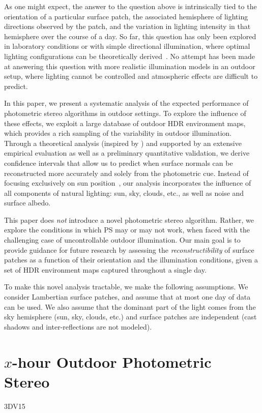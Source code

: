 \documentclass{report}
\begin{document}
As one might expect, the answer to the question above is intrinsically tied to the orientation of a particular surface patch, the associated hemisphere of lighting directions observed by the patch, and the variation in lighting intensity in that hemisphere over the course of a day. So far, this question has only been explored in laboratory conditions or with simple directional illumination, where optimal lighting configurations can be theoretically derived~\cite{drbohlav-iccv-05,klaudiny-prl-14,shen-pg-14}. No attempt has been made at answering this question with more realistic illumination models in an outdoor setup, where lighting cannot be controlled and atmospheric effects are difficult to predict.

In this paper, we present a systematic analysis of the expected performance of photometric stereo algorithms in outdoor settings. To explore the influence of these effects, we exploit a large database of outdoor HDR environment maps, which provides a rich sampling of the variability in outdoor illumination. Through a theoretical analysis (inspired by \cite{sun-ivc-07}) and supported by an extensive empirical evaluation as well as a preliminary quantitative validation, we derive confidence intervals that allow us to predict when surface normals can be reconstructed more accurately and solely from the photometric cue. Instead of focusing exclusively on sun position~\cite{shen-pg-14}, our analysis incorporates the influence of all components of natural lighting: sun, sky, clouds, etc., as well as noise and surface albedo. 

This paper does \emph{not} introduce a novel photometric stereo algorithm. Rather, we explore the conditions in which PS may or may not work, when faced with the challenging case of uncontrollable outdoor illumination. Our main goal is to provide guidance for future research by assessing the \emph{reconstructibility} of surface patches as a function of their orientation and the illumination conditions, given a set of HDR environment maps captured throughout a single day.

To make this novel analysis tractable, we make the following assumptions. We consider Lambertian surface patches, and assume that at most one day of data can be used. We also assume that the dominant part of the light comes from the sky hemisphere (sun, sky, clouds, etc.) and surface patches are independent (cast shadows and inter-reflections are not modeled).


\section{$x$-hour Outdoor Photometric Stereo}
3DV15
\end{document}
